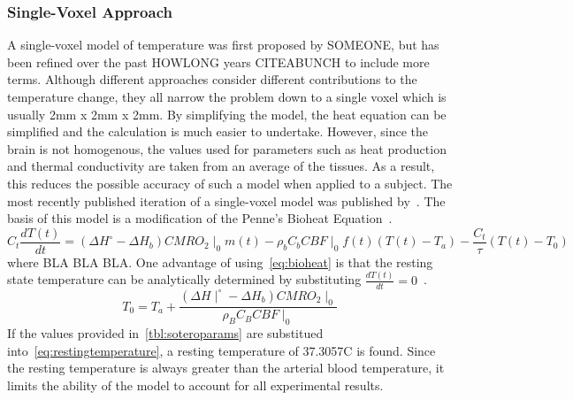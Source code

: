     \subsubsection{Single-Voxel Approach}
    A single-voxel model of temperature was first proposed by SOMEONE, but has been refined over the past HOWLONG years CITEABUNCH to include more terms.  Although different approaches consider different contributions to the temperature change, they all narrow the problem down to a single voxel which is usually 2mm x 2mm x 2mm.  By simplifying the model, the heat equation can be simplified and the calculation is much easier to undertake.  However, since the brain is not homogenous, the values used for parameters such as heat production and thermal conductivity are taken from an average of the tissues.  As a result, this reduces the possible accuracy of such a model when applied to a subject.
    The most recently published iteration of a single-voxel model was published by~\citet{sotero2011}.  The basis of this model is a modification of the Penne's Bioheat Equation~\citep{pennes, sotero2011}.
    \begin{equation}
      \label{eq:bioheat}
      C_t \frac{dT(t)}{dt} = (\Delta H^{\circ}-\Delta H_{b}) CMRO_{2}\mid_{0} m(t) - \rho_{b} C_{b} CBF\mid_{0} f(t) (T(t) - T_{a}) - \frac{C_{t}}{\tau} (T(t)-T_{0})
    \end{equation}
    where BLA BLA BLA.  
    One advantage of using~\cref{eq:bioheat} is that the resting state temperature can be analytically determined by substituting $\frac{dT(t)}{dt} = 0$~\citep{sotero2011}.
    \begin{equation}
      \label{eq:restingtemperature}
      T_{0} = T_{a} + \frac{(\Delta H \mid^{\circ} - \Delta H_{b}) CMRO_{2}\mid_{0}}{\rho_{B} C_{B} CBF\mid_{0}}
    \end{equation}
    If the values provided in~\cref{tbl:soteroparams} are substitued into~\cref{eq:restingtemperature}, a resting temperature of 37.3057\degree C is found.  Since the resting temperature is always greater than the arterial blood temperature, it limits the ability of the model to account for all experimental results. 
    
